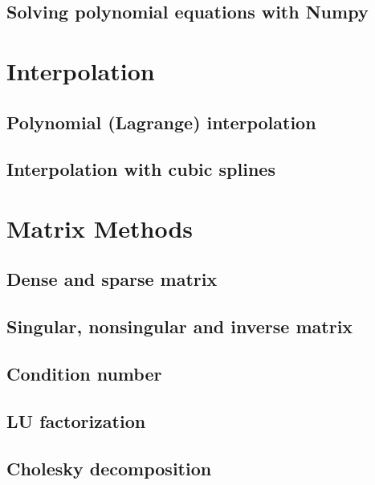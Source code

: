 \documentclass[article,A4,12pt]{llncs}
\begin{document}
\subsection{Solving polynomial equations with Numpy}





\section{Interpolation}





\subsection{Polynomial (Lagrange) interpolation}




\subsection{Interpolation with cubic splines}



\section{Matrix Methods}



\subsection{Dense and sparse matrix}


\subsection{Singular, nonsingular and inverse matrix}


\subsection{Condition number}


\subsection{LU factorization}


\subsection{Cholesky decomposition}
\end{document}
